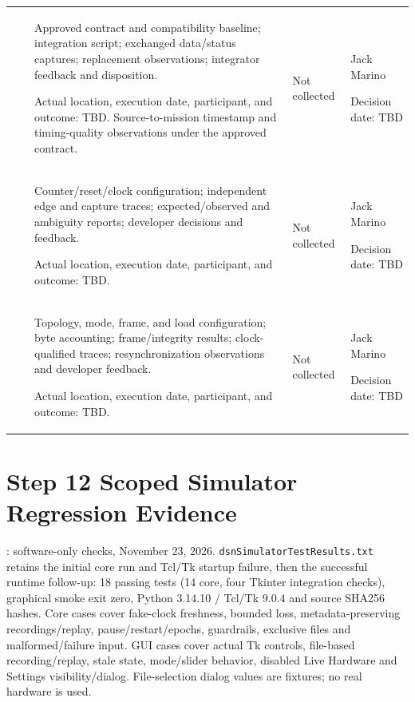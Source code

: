 \begin{landscape}
\begin{tabularx}{\linewidth}{L{2cm}L{2.6cm}Y L{2.3cm}L{2.6cm}}
 & \par {} & Approved contract and compatibility baseline; integration script; exchanged data/status captures; replacement observations; integrator feedback and disposition.\par Actual location, execution date, participant, and outcome: TBD. Source-to-mission timestamp and timing-quality observations under the approved contract. & Not collected & Jack Marino\par Decision date: TBD\\
 & \par {} & Counter/reset/clock configuration; independent edge and capture traces; expected/observed and ambiguity reports; developer decisions and feedback.\par Actual location, execution date, participant, and outcome: TBD. & Not collected & Jack Marino\par Decision date: TBD\\
 & \par {} & Topology, mode, frame, and load configuration; byte accounting; frame/integrity results; clock-qualified traces; resynchronization observations and developer feedback.\par Actual location, execution date, participant, and outcome: TBD. & Not collected & Jack Marino\par Decision date: TBD\\
\end{tabularx}
\normalsize
\end{landscape}

\section{Step 12 Scoped Simulator Regression Evidence}
\label{Section:SimulatorEvidence}
: software-only checks, November 23, 2026.
\texttt{dsnSimulatorTestResults.txt} retains the initial core run and Tcl/Tk
startup failure, then the successful runtime follow-up: 18 passing tests
(14 core, four Tkinter integration checks), graphical smoke exit zero,
Python 3.14.10 / Tcl/Tk 9.0.4 and source SHA256 hashes. Core cases cover
fake-clock freshness, bounded loss, metadata-preserving recordings/replay,
pause/restart/epochs, guardrails, exclusive files and malformed/failure input.
GUI cases cover actual Tk controls, file-based recording/replay, stale state,
mode/slider behavior, disabled Live Hardware and Settings visibility/dialog.
File-selection dialog values are fixtures; no real hardware is used.

